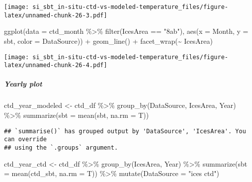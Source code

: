 \documentclass[
]{article}
\newenvironment{Shaded}{\begin{snugshade}}{\end{snugshade}}
\newcommand{\AttributeTok}[1]{\textcolor[rgb]{0.77,0.63,0.00}{#1}}
\newcommand{\FunctionTok}[1]{\textcolor[rgb]{0.00,0.00,0.00}{#1}}
\newcommand{\NormalTok}[1]{#1}
\newcommand{\OtherTok}[1]{\textcolor[rgb]{0.56,0.35,0.01}{#1}}
\newcommand{\SpecialCharTok}[1]{\textcolor[rgb]{0.00,0.00,0.00}{#1}}
\newcommand{\StringTok}[1]{\textcolor[rgb]{0.31,0.60,0.02}{#1}}
\begin{document}
\texttt{[image: si\_sbt\_in-situ-ctd-vs-modeled-temperature\_files/figure-latex/unnamed-chunk-26-3.pdf]}

\begin{Shaded}
\begin{Highlighting}[]
\FunctionTok{ggplot}\NormalTok{(}\AttributeTok{data =}\NormalTok{ ctd\_month }\SpecialCharTok{\%\textgreater{}\%} \FunctionTok{filter}\NormalTok{(IcesArea }\SpecialCharTok{==} \StringTok{"8ab"}\NormalTok{), }\FunctionTok{aes}\NormalTok{(}\AttributeTok{x =}\NormalTok{ Month, }\AttributeTok{y =}\NormalTok{ sbt, }\AttributeTok{color =}\NormalTok{ DataSource)) }\SpecialCharTok{+} \FunctionTok{geom\_line}\NormalTok{() }\SpecialCharTok{+} \FunctionTok{facet\_wrap}\NormalTok{(}\SpecialCharTok{\textasciitilde{}}\NormalTok{ IcesArea) }
\end{Highlighting}
\end{Shaded}

\texttt{[image: si\_sbt\_in-situ-ctd-vs-modeled-temperature\_files/figure-latex/unnamed-chunk-26-4.pdf]}

\hypertarget{yearly-plot-1}{%
\subparagraph{Yearly plot}\label{yearly-plot-1}}

\begin{Shaded}
\begin{Highlighting}[]
\NormalTok{ctd\_year\_modeled }\OtherTok{\textless{}{-}}\NormalTok{ ctd\_df }\SpecialCharTok{\%\textgreater{}\%} 
  \FunctionTok{group\_by}\NormalTok{(DataSource, IcesArea, Year) }\SpecialCharTok{\%\textgreater{}\%} 
  \FunctionTok{summarize}\NormalTok{(}\AttributeTok{sbt =} \FunctionTok{mean}\NormalTok{(sbt, }\AttributeTok{na.rm =}\NormalTok{ T))}
\end{Highlighting}
\end{Shaded}

\begin{verbatim}
## `summarise()` has grouped output by 'DataSource', 'IcesArea'. You can override
## using the `.groups` argument.
\end{verbatim}

\begin{Shaded}
\begin{Highlighting}[]
\NormalTok{ctd\_year\_ctd }\OtherTok{\textless{}{-}}\NormalTok{ ctd\_df }\SpecialCharTok{\%\textgreater{}\%} 
  \FunctionTok{group\_by}\NormalTok{(IcesArea, Year) }\SpecialCharTok{\%\textgreater{}\%}
  \FunctionTok{summarize}\NormalTok{(}\AttributeTok{sbt =} \FunctionTok{mean}\NormalTok{(ctd\_sbt, }\AttributeTok{na.rm =}\NormalTok{ T)) }\SpecialCharTok{\%\textgreater{}\%}
  \FunctionTok{mutate}\NormalTok{(}\AttributeTok{DataSource =} \StringTok{"ices ctd"}\NormalTok{)}
\end{Highlighting}
\end{Shaded}
\end{document}
